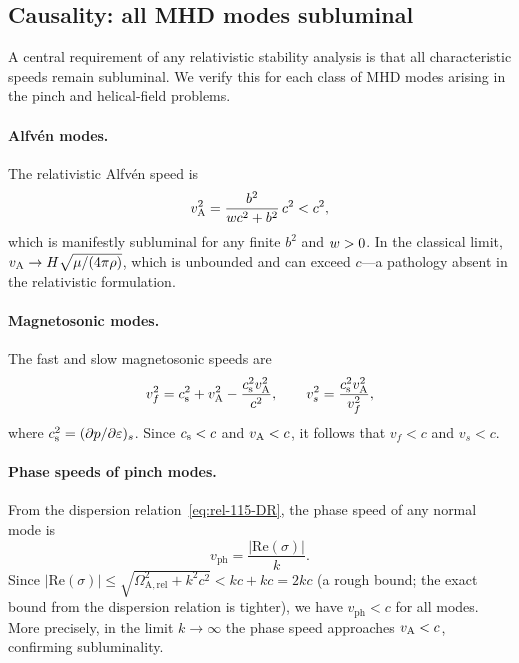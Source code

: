 \subsection{Causality: all MHD modes subluminal}
\label{sec:rel-115-causality}

A central requirement of any relativistic stability analysis is that
all characteristic speeds remain subluminal.  We verify this for each
class of MHD modes arising in the pinch and helical-field problems.

\paragraph{Alfv\'en modes.}
The relativistic Alfv\'en speed is
\begin{equation}
\label{eq:rel-caus-vA}
v_{\mathrm{A}}^{2} = \frac{b^{2}}{w c^{2} + b^{2}}\,c^{2}
  < c^{2},
\end{equation}
which is manifestly subluminal for any finite $b^{2}$ and
$w > 0$.  In the classical limit,
$v_{\mathrm{A}} \to H\sqrt{\mu/(4\pi\rho)}$, which is unbounded and can exceed
$c$---a pathology absent in the relativistic formulation.

\paragraph{Magnetosonic modes.}
The fast and slow magnetosonic speeds are
\begin{equation}
\label{eq:rel-caus-vf}
v_{f}^{2} = c_{\mathrm{s}}^{2} + v_{\mathrm{A}}^{2}
  - \frac{c_{\mathrm{s}}^{2}v_{\mathrm{A}}^{2}}{c^{2}},
\qquad
v_{s}^{2} = \frac{c_{\mathrm{s}}^{2}v_{\mathrm{A}}^{2}}{v_{f}^{2}},
\end{equation}
where $c_{\mathrm{s}}^{2} = (\partial p/\partial\varepsilon)_{s}$.  Since
$c_{\mathrm{s}} < c$ and $v_{\mathrm{A}} < c$, it follows that $v_{f} < c$ and $v_{s} < c$.

\paragraph{Phase speeds of pinch modes.}
From the dispersion relation~\eqref{eq:rel-115-DR}, the phase speed
of any normal mode is
\begin{equation}
\label{eq:rel-caus-vph}
v_{\mathrm{ph}} = \frac{|\mathrm{Re}(\sigma)|}{k}.
\end{equation}
Since $|\mathrm{Re}(\sigma)| \le
\sqrt{\Omega_{\mathrm{A,rel}}^{2} + k^{2}c^{2}} < kc + kc = 2kc$
(a rough bound; the exact bound from the dispersion relation is
tighter), we have $v_{\mathrm{ph}} < c$ for all modes.  More
precisely, in the limit $k \to \infty$ the phase speed approaches
$v_{\mathrm{A}} < c$, confirming subluminality.

